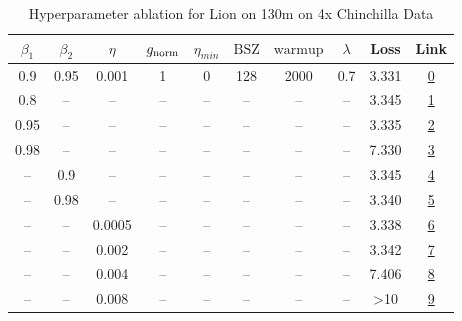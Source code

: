 \begin{table}[H]
\centering
\caption{Hyperparameter ablation for Lion on 130m on 4x Chinchilla Data}
\label{tab:ablation_lion_130m_on_4x_chinchilla_data}
\begin{tabular}{cccccccccc}
\toprule
$\beta_1$ & $\beta_2$ & $\eta$ & $g_{\mathrm{norm}}$ & $\eta_{min}$ & $\mathrm{BSZ}$ & $\mathrm{warmup}$ & $\lambda$ & Loss & Link \\
\midrule
0.9 & 0.95 & 0.001 & 1 & 0 & 128 & 2000 & 0.7 & 3.331 & \href{https://wandb.ai/marin-community/optimizer-scaling/runs/sweep-130m-10B-liondd8061alr0.001-wd0.7-minlr0-warmup2000-b10.9--72b789}{0} \\
\midrule
0.8 & -- & -- & -- & -- & -- & -- & -- & 3.345 & \href{https://wandb.ai/marin-community/optimizer-scaling/runs/sweep-130m-10B-lion6ebc4dlr0.001-wd0.7-minlr0-warmup2000-b10.8-b-9ccc4b}{1} \\
0.95 & -- & -- & -- & -- & -- & -- & -- & 3.335 & \href{https://wandb.ai/marin-community/optimizer-scaling/runs/sweep-130m-10B-lionk6ee825lr0.001-wd0.7-minlr0-warmup2000-b10.95-4aeb28}{2} \\
0.98 & -- & -- & -- & -- & -- & -- & -- & 7.330 & \href{https://wandb.ai/marin-community/optimizer-scaling/runs/sweep-130m-10B-lionk98635alr0.001-wd0.7-minlr0-warmup2000-b10.98-20924d}{3} \\
-- & 0.9 & -- & -- & -- & -- & -- & -- & 3.345 & \href{https://wandb.ai/marin-community/optimizer-scaling/runs/sweep-130m-10B-lioncda5edlr0.001-wd0.7-minlr0-warmup2000-b10.9-b-6a3aec}{4} \\
-- & 0.98 & -- & -- & -- & -- & -- & -- & 3.340 & \href{https://wandb.ai/marin-community/optimizer-scaling/runs/sweep-130m-10B-lion489f64lr0.001-wd0.7-minlr0-warmup2000-b10.9-b-e5b223}{5} \\
-- & -- & 0.0005 & -- & -- & -- & -- & -- & 3.338 & \href{https://wandb.ai/marin-community/optimizer-scaling/runs/sweep-130m-10B-lionfc33e8lr0.0005-wd0.7-minlr0-warmup2000-b10.9--abc4e2}{6} \\
-- & -- & 0.002 & -- & -- & -- & -- & -- & 3.342 & \href{https://wandb.ai/marin-community/optimizer-scaling/runs/sweep-130m-10B-lionp2ece3elr0.002-wd0.7-minlr0-warmup2000-b10.9--9f5952}{7} \\
-- & -- & 0.004 & -- & -- & -- & -- & -- & 7.406 & \href{https://wandb.ai/marin-community/optimizer-scaling/runs/sweep-130m-10B-liond13cd19lr0.004-wd0.7-minlr0-warmup2000-b10.9--ef33c1}{8} \\
-- & -- & 0.008 & -- & -- & -- & -- & -- & >10 & \href{https://wandb.ai/marin-community/optimizer-scaling/runs/sweep-130m-10B-lionbfc5e9lr0.008-wd0.7-minlr0-warmup2000-b10.9-b-1af583}{9} \\

\end{tabular}
\end{table}
